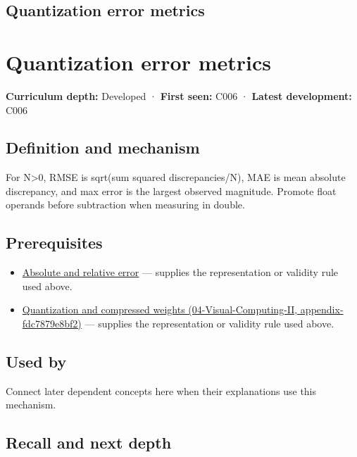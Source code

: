 \hypertarget{appendix-537171d69d27}{}
\section*{Quantization error metrics}
\chapter{Quantization error metrics}\label{appendix-537171d69d27-quantization-error-metrics}

\textbf{Curriculum depth:} Developed · \textbf{First seen:} C006 · \textbf{Latest development:} C006

\section{Definition and mechanism}\label{appendix-537171d69d27-definition-and-mechanism}

For N\textgreater0, RMSE is sqrt(sum squared discrepancies/N), MAE is mean absolute discrepancy, and max error is the largest observed magnitude. Promote float operands before subtraction when measuring in double.

\section{Prerequisites}\label{appendix-537171d69d27-prerequisites}

\begin{itemize}
\tightlist
\item
  \hyperref[appendix-3ae74e89b4e6]{Absolute and relative error} --- supplies the representation or validity rule used above.
\item
  \href{../04-Visual-Computing-II/main.pdf\#nameddest=appendix-fdc7879e8bf2}{Quantization and compressed weights (04-Visual-Computing-II, appendix-fdc7879e8bf2)} --- supplies the representation or validity rule used above.
\end{itemize}

\section{Used by}\label{appendix-537171d69d27-used-by}

Connect later dependent concepts here when their explanations use this mechanism.

\section{Recall and next depth}\label{appendix-537171d69d27-recall-and-next-depth}

